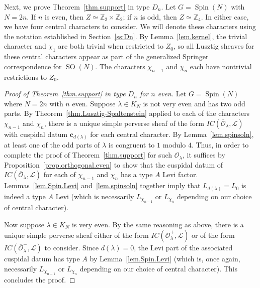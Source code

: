 \documentclass[reqno,11pt]{amsart}
\theoremstyle{remark}
\theoremstyle{remark}
\theoremstyle{definition}
\theoremstyle{definition}
\theoremstyle{definition}
\numberwithin{equation}{section}
\newcommand{\Z}{\mathbb{ Z}}           %
\newcommand{\SO}{\operatorname{SO}}
\newcommand{\Spin}{\operatorname{Spin}}
\newcommand{\cl}{\mathcal{L}}
\newcommand{\co}{\mathcal{O}}
\begin{document}
Next, we prove Theorem~\ref{thm.support} in type $D_n$.  Let $G=\Spin(N)$ with $N=2n$.  If $n$ is even, then $Z \simeq \Z_2\times \Z_2$; if $n$ is odd, then $Z\simeq \mathbb Z_4$.
In either case, we have four central characters to consider.  We will denote these characters using the notation established in Section~\ref{ss:Dn}.  By Lemma~\ref{lem.kernel}, the trivial character and $\chi_1$ are both trivial when restricted to $Z_0$, so all Lusztig sheaves for these central characters appear as part of the generalized Springer correspondence for $\SO(N)$.  The characters $\chi_{n-1}$ and $\chi_{n}$ each have nontrivial restrictions to $Z_0$.  


\begin{proof}[Proof of Theorem~\ref{thm.support} in type $D_n$ for $n$ even] Let $G= \Spin(N)$ where $N=2n$ with $n$ even. Suppose $\lambda\in K_N$ is not very even and has two odd parts. By Theorem~\ref{thm.Lusztig-Spaltenstein} applied to each of the characters $\chi_{n-1}$ and $\chi_n$, there is a unique simple perverse sheaf of the form $IC(\overline{\co}_\lambda, \cl)$ with cuspidal datum $\mathbf{c}_{d(\lambda)}$ for each central character. By Lemma~\ref{lem.spinsoln}, at least one of the odd parts of $\lambda$ is congruent to $1$ modulo $4$. Thus, in order to complete the proof of Theorem~\ref{thm.support} for such $\co_\lambda$, it suffices by Proposition~\ref{prop.orthogonal.even} to show that the cuspidal datum of $IC(\overline{\co}_\lambda, \cl)$ for each of $\chi_{n-1}$ and $\chi_n$ has a type $A$ Levi factor. Lemmas~\ref{lem.Spin.Levi} and~\ref{lem.spinsoln} together imply that $L_{d(\lambda)} = L_{0}$ is indeed a type $A$ Levi (which is necessarily $L_{\chi_{n-1}}$ or $L_{\chi_n}$ depending on our choice of central character).  



Now suppose $\lambda\in K_N$ is very even. By the same reasoning as above, there is a unique simple perverse sheaf either of the form $IC(\overline{\co}_\lambda^+, \cl)$ or of the form $IC(\overline{\co}_\lambda^-, \cl)$ to consider. Since $d(\lambda)=0$, the Levi part of the associated cuspidal datum has type $A$ by Lemma~\ref{lem.Spin.Levi} (which is, once again, necessarily $L_{\chi_{n-1}}$ or $L_{\chi_n}$ depending on our choice of central character). This concludes the proof.
\end{proof}
\end{document}

